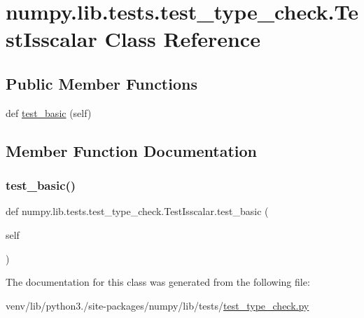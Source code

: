\hypertarget{classnumpy_1_1lib_1_1tests_1_1test__type__check_1_1TestIsscalar}{}\section{numpy.\+lib.\+tests.\+test\+\_\+type\+\_\+check.\+Test\+Isscalar Class Reference}
\label{classnumpy_1_1lib_1_1tests_1_1test__type__check_1_1TestIsscalar}
\subsection*{Public Member Functions}
\begin{DoxyCompactItemize}
\item 
def \hyperlink{classnumpy_1_1lib_1_1tests_1_1test__type__check_1_1TestIsscalar_a7bbb7c722ff17250c36029863afff5df}{test\+\_\+basic} (self)
\end{DoxyCompactItemize}


\subsection{Member Function Documentation}
\mbox{\label{classnumpy_1_1lib_1_1tests_1_1test__type__check_1_1TestIsscalar_a7bbb7c722ff17250c36029863afff5df}} 
\subsubsection{\texorpdfstring{test\+\_\+basic()}{test\_basic()}}
{\footnotesize\ttfamily def numpy.\+lib.\+tests.\+test\+\_\+type\+\_\+check.\+Test\+Isscalar.\+test\+\_\+basic (\begin{DoxyParamCaption}\item[{}]{self }\end{DoxyParamCaption})}



The documentation for this class was generated from the following file\+:\begin{DoxyCompactItemize}
\item 
venv/lib/python3./site-\/packages/numpy/lib/tests/\hyperlink{test__type__check_8py}{test\+\_\+type\+\_\+check.\+py}\end{DoxyCompactItemize}
